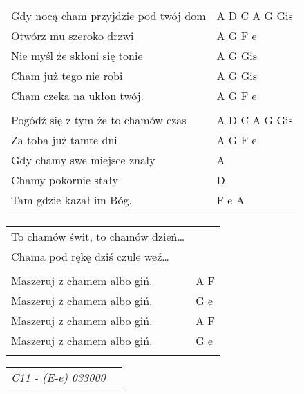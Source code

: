 \documentclass[a5paper]{article}
\begin{document}
\noindent
\begin{tabular}{@{}p{8.00cm}p{3cm}@{}}
Gdy nocą cham przyjdzie pod twój dom & A D C A G Gis \\
Otwórz mu szeroko drzwi & A G F e \\
Nie myśl że skłoni się tonie & A G Gis \\
Cham już tego nie robi & A G Gis \\
Cham czeka na ukłon twój. & A G F e \\ \\

Pogódź się z tym że to chamów czas & A D C A G Gis \\
Za toba już tamte dni & A G F e \\
Gdy chamy swe miejsce znały & A \\
Chamy pokornie stały & D \\
Tam gdzie kazał im Bóg. & F e A \\ \\
\end{tabular}

\noindent
\begin{tabular}{@{}p{7.00cm}p{3cm}@{}}
	To chamów świt, to chamów dzień… \\
	Chama pod rękę dziś czule weź… \\ \\

	Maszeruj z chamem albo giń. & A F \\
	Maszeruj z chamem albo giń. & G e \\
	Maszeruj z chamem albo giń. & A F \\
	Maszeruj z chamem albo giń. & G e \\ \\
\end{tabular}

\noindent
\begin{tabular}{@{}p{7.50cm}p{3cm}@{}}
\emph{C11 - (E-e) 033000}
\end{tabular}
\end{document}
